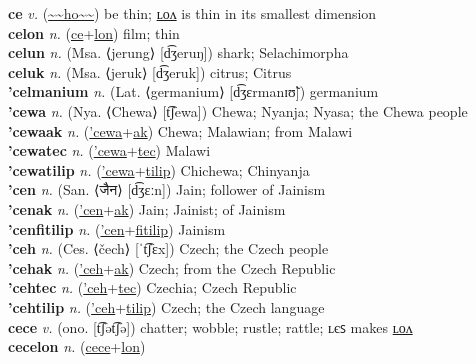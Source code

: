 \textbf{ce} \textit{v.} (\hyperref[ho]{\~{}\~{}ho\~{}\~{}})
be thin; \hyperref[celon]{ʟᴏᴧ} is thin in its smallest dimension \label{ce} \\
\textbf{celon} \textit{n.} (\hyperref[ce]{ce}+\hyperref[lon]{lon})
film; thin \label{celon} \\
\textbf{celun} \textit{n.} (Msa. ⟨jerung⟩ [d͡ʒeruŋ])
shark; Selachimorpha \label{celun} \\
\textbf{celuk} \textit{n.} (Msa. ⟨jeruk⟩ [d͡ʒeruk])
citrus; Citrus \label{celuk} \\
\textbf{'celmanium} \textit{n.} (Lat. ⟨germanium⟩ [d͡ʒɛrmanɪʊ̃])
germanium \label{'celmanium} \\
\textbf{'cewa} \textit{n.} (Nya. ⟨Chewa⟩ [t͡ʃewa])
Chewa; Nyanja; Nyasa; the Chewa people \label{'cewa} \\
\textbf{'cewaak} \textit{n.} (\hyperref['cewa]{'cewa}+\hyperref[ak]{ak})
Chewa; Malawian; from Malawi \label{'cewaak} \\
\textbf{'cewatec} \textit{n.} (\hyperref['cewa]{'cewa}+\hyperref[tec]{tec})
Malawi \label{'cewatec} \\
\textbf{'cewatilip} \textit{n.} (\hyperref['cewa]{'cewa}+\hyperref[tilip]{tilip})
Chichewa; Chinyanja \label{'cewatilip} \\
\textbf{'cen} \textit{n.} (San. ⟨जैन⟩ [d͡ʒɛːn])
Jain; follower of Jainism \label{'cen} \\
\textbf{'cenak} \textit{n.} (\hyperref['cen]{'cen}+\hyperref[ak]{ak})
Jain; Jainist; of Jainism \label{'cenak} \\
\textbf{'cenfitilip} \textit{n.} (\hyperref['cen]{'cen}+\hyperref[fitilip]{fitilip})
Jainism \label{'cenfitilip} \\
\textbf{'ceh} \textit{n.} (Ces. ⟨čech⟩ [ˈt͡ʃɛx])
Czech; the Czech people \label{'ceh} \\
\textbf{'cehak} \textit{n.} (\hyperref['ceh]{'ceh}+\hyperref[ak]{ak})
Czech; from the Czech Republic \label{'cehak} \\
\textbf{'cehtec} \textit{n.} (\hyperref['ceh]{'ceh}+\hyperref[tec]{tec})
Czechia; Czech Republic \label{'cehtec} \\
\textbf{'cehtilip} \textit{n.} (\hyperref['ceh]{'ceh}+\hyperref[tilip]{tilip})
Czech; the Czech language \label{'cehtilip} \\
\textbf{cece} \textit{v.} (ono. [t͡ʃət͡ʃə])
chatter; wobble; rustle; rattle; ʟєꜱ makes \hyperref[cecelon]{ʟᴏᴧ} \label{cece} \\
\textbf{cecelon} \textit{n.} (\hyperref[cece]{cece}+\hyperref[lon]{lon})
